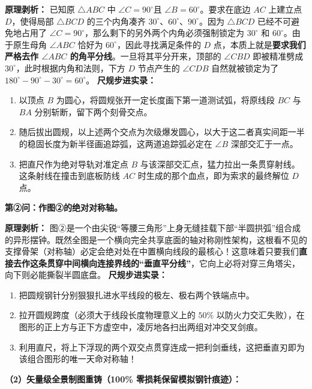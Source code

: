 \textbf{原理剥析：} 已知原 $\triangle ABC$ 中 $\angle C = 90^\circ$且 $\angle B = 60^\circ$。要求在底边 $AC$ 上建立点 $D$，使得局部 $\triangle BCD$ 的三个内角凑齐 $30^\circ$、$60^\circ$、$90^\circ$。因为 $\triangle BCD$ 已经不可避免地占用了 $\angle C = 90^\circ$，那么剩下的另外两个内角必须强制锁定为 $30^\circ$ 和 $60^\circ$。由于原生母角 $\angle ABC$ 恰好为 $60^\circ$，因此寻找满足条件的 $D$ 点，本质上就是\textbf{要求我们严格去作 $\angle ABC$ 的角平分线}。一旦将其平分开来，顶部的 $\angle CBD$ 即被精准劈成 $30^\circ$，此时根据内角和法则，下方 $D$ 节点产生的 $\angle CDB$ 自然就被锁定为了 $180^\circ - 90^\circ - 30^\circ = 60^\circ$。
\textbf{尺规步进实录：}
\begin{enumerate}
    \item 以顶点 $B$ 为圆心，将圆规张开一定长度画下第一道测试弧，将原线段 $BC$ 与 $BA$ 分别斩断，留下两个刻骨交点。
    \item 随后拔出圆规，以上述两个交点为次级爆发圆心，以大于这二者真实间距一半的稳固长度为新半径画追踪弧，这两道追踪弧必定在 $\angle B$ 深部交汇于一点。
    \item 把直尺作为绝对导轨对准定点 $B$ 与该深部交汇点，猛力拉出一条贯穿射线。这条射线在撞击到底板防线 $AC$ 时生成的那个血点，即为索求的最终解位 $D$ 点。
\end{enumerate}

\textbf{第②问：作图②的绝对对称轴。}

\textbf{原理剥析：} 图②是一个由尖锐“等腰三角形”上身无缝挂载下部“半圆拱弧”组合成的异形摆钟。既然全图是一个横向完全共享底面的轴对称刚性架构，这根看不见的支撑骨架（对称轴）必定会绝对处在中置横向线段的最核心！这意味着只要我们\textbf{直接去作这条贯穿中间横向连接界线的“垂直平分线”}，它向上必将对穿三角塔尖，向下则必能撕裂半圆底盘。
\textbf{尺规步进实录：}
\begin{enumerate}
    \item 把圆规钢针分别狠狠扎进水平线段的极左、极右两个铁端点中。
    \item 拉开圆规跨度（必须大于线段长度物理意义上的 $50\%$ 以防火力交汇失败），在图形的正上方与正下方虚空中，凌厉地各扫出两组对冲交叉剑痕。
    \item 利用直尺，将上下浮现的两个双交点贯穿连成一把利剑垂线，这把垂直刃即为该组合图形的唯一天命对称轴！
\end{enumerate}

\textbf{（2）矢量级全景制图重铸（100\% 零损耗保留模拟钢针痕迹）：}

